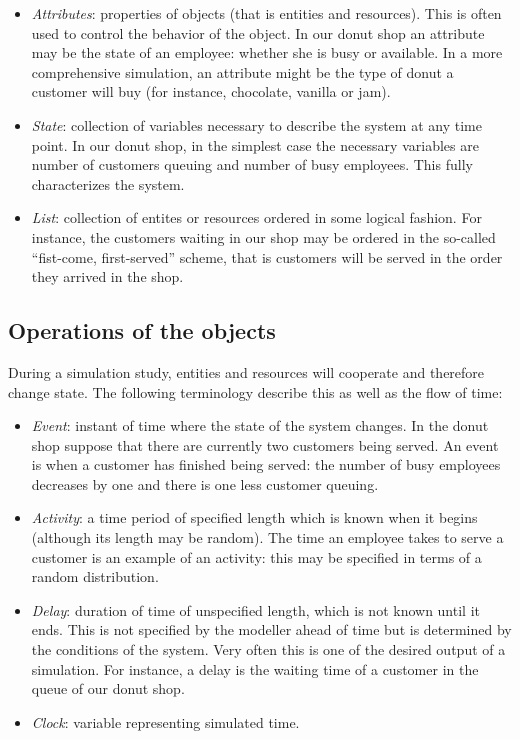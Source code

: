 \documentclass[
]{book}
\theoremstyle{definition}
\theoremstyle{definition}
\theoremstyle{definition}
\theoremstyle{definition}
\theoremstyle{remark}
\begin{document}
\begin{itemize}
\item
  \emph{Attributes}: properties of objects (that is entities and resources). This is often used to control the behavior of the object. In our donut shop an attribute may be the state of an employee: whether she is busy or available. In a more comprehensive simulation, an attribute might be the type of donut a customer will buy (for instance, chocolate, vanilla or jam).
\item
  \emph{State}: collection of variables necessary to describe the system at any time point. In our donut shop, in the simplest case the necessary variables are number of customers queuing and number of busy employees. This fully characterizes the system.
\item
  \emph{List}: collection of entites or resources ordered in some logical fashion. For instance, the customers waiting in our shop may be ordered in the so-called ``fist-come, first-served'' scheme, that is customers will be served in the order they arrived in the shop.
\end{itemize}

\hypertarget{operations-of-the-objects}{%
\subsection{Operations of the objects}\label{operations-of-the-objects}}

During a simulation study, entities and resources will cooperate and therefore change state. The following terminology describe this as well as the flow of time:

\begin{itemize}
\item
  \emph{Event}: instant of time where the state of the system changes. In the donut shop suppose that there are currently two customers being served. An event is when a customer has finished being served: the number of busy employees decreases by one and there is one less customer queuing.
\item
  \emph{Activity}: a time period of specified length which is known when it begins (although its length may be random). The time an employee takes to serve a customer is an example of an activity: this may be specified in terms of a random distribution.
\item
  \emph{Delay}: duration of time of unspecified length, which is not known until it ends. This is not specified by the modeller ahead of time but is determined by the conditions of the system. Very often this is one of the desired output of a simulation. For instance, a delay is the waiting time of a customer in the queue of our donut shop.
\item
  \emph{Clock}: variable representing simulated time.
\end{itemize}
\end{document}
